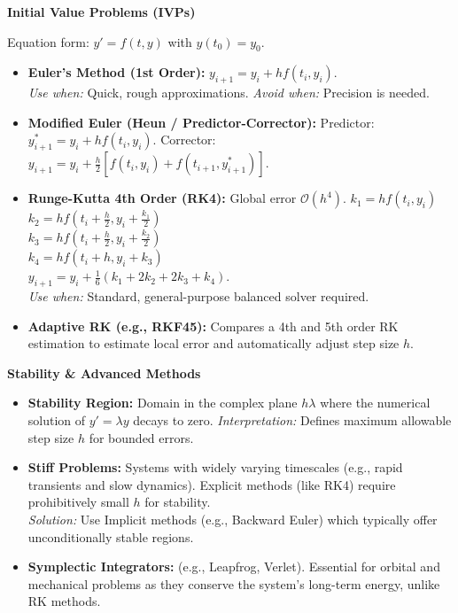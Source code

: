 \documentclass[10pt, landscape, twocolumn]{article}
\newcommand{\cheatsheetsubsection}[1]{
    \vspace{0.4em}
    {\color{themeblue}\normalsize\bfseries #1} \par
    \vspace{0.1em}
}
\begin{document}
\cheatsheetsubsection{Initial Value Problems (IVPs)}
Equation form: $y' = f(t, y)$ with $y(t_0) = y_0$.
\begin{itemize}[leftmargin=*, nosep]
    \item \textbf{Euler's Method (1st Order):} $y_{i+1} = y_i + h f(t_i, y_i)$. \\
    \textit{Use when:} Quick, rough approximations. \textit{Avoid when:} Precision is needed.
    \item \textbf{Modified Euler (Heun / Predictor-Corrector):} 
    Predictor: $y_{i+1}^* = y_i + h f(t_i, y_i)$.
    Corrector: $y_{i+1} = y_i + \frac{h}{2}[f(t_i, y_i) + f(t_{i+1}, y_{i+1}^*)]$.
    \newpage
    \item \textbf{Runge-Kutta 4th Order (RK4):} Global error $\mathcal{O}(h^4)$.
    $k_1 = h f(t_i, y_i)$ \\
    $k_2 = h f(t_i + \frac{h}{2}, y_i + \frac{k_1}{2})$ \\
    $k_3 = h f(t_i + \frac{h}{2}, y_i + \frac{k_2}{2})$ \\
    $k_4 = h f(t_i + h, y_i + k_3)$ \\
    $y_{i+1} = y_i + \frac{1}{6}(k_1 + 2k_2 + 2k_3 + k_4)$. \\
    \textit{Use when:} Standard, general-purpose balanced solver required.
    \item \textbf{Adaptive RK (e.g., RKF45):} Compares a 4th and 5th order RK estimation to estimate local error and automatically adjust step size $h$. 
\end{itemize}

\cheatsheetsubsection{Stability \& Advanced Methods}
\begin{itemize}[leftmargin=*, nosep]
    \item \textbf{Stability Region:} Domain in the complex plane $h\lambda$ where the numerical solution of $y'=\lambda y$ decays to zero. 
    \textit{Interpretation:} Defines maximum allowable step size $h$ for bounded errors.
    \item \textbf{Stiff Problems:} Systems with widely varying timescales (e.g., rapid transients and slow dynamics). Explicit methods (like RK4) require prohibitively small $h$ for stability. \\
    \textit{Solution:} Use Implicit methods (e.g., Backward Euler) which typically offer unconditionally stable regions.
    \item \textbf{Symplectic Integrators:} (e.g., Leapfrog, Verlet). Essential for orbital and mechanical problems as they conserve the system's long-term energy, unlike RK methods.
\end{itemize}
\end{document}
